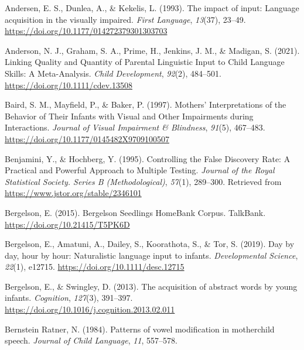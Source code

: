 \documentclass[
  man]{apa6}
\newlength{\cslhangindent}
\newlength{\cslentryspacingunit} %
\newenvironment{CSLReferences}[2] %
 {%
  \setlength{\parindent}{0pt}
  \ifodd #1
  \let\oldpar\par
  \def\par{\hangindent=\cslhangindent\oldpar}
  \fi
  \setlength{\parskip}{#2\cslentryspacingunit}
 }%
 {}
\begin{document}
\hypertarget{refs}{}
\begin{CSLReferences}{1}{0}
\leavevmode{}%
Andersen, E. S., Dunlea, A., \& Kekelis, L. (1993). The impact of input: Language acquisition in the visually impaired. \emph{First Language}, \emph{13}(37), 23--49. \url{https://doi.org/10.1177/014272379301303703}

\leavevmode{}%
Anderson, N. J., Graham, S. A., Prime, H., Jenkins, J. M., \& Madigan, S. (2021). Linking {Quality} and {Quantity} of {Parental Linguistic Input} to {Child Language Skills}: {A Meta-Analysis}. \emph{Child Development}, \emph{92}(2), 484--501. \url{https://doi.org/10.1111/cdev.13508}

\leavevmode{}%
Baird, S. M., Mayfield, P., \& Baker, P. (1997). Mothers' {Interpretations} of the {Behavior} of {Their Infants} with {Visual} and {Other Impairments} during {Interactions}. \emph{Journal of Visual Impairment \& Blindness}, \emph{91}(5), 467--483. \url{https://doi.org/10.1177/0145482X9709100507}

\leavevmode{}%
Benjamini, Y., \& Hochberg, Y. (1995). Controlling the {False Discovery Rate}: {A Practical} and {Powerful Approach} to {Multiple Testing}. \emph{Journal of the Royal Statistical Society. Series B (Methodological)}, \emph{57}(1), 289--300. Retrieved from \url{https://www.jstor.org/stable/2346101}

\leavevmode{}%
Bergelson, E. (2015). Bergelson {Seedlings HomeBank Corpus}. {TalkBank}. \url{https://doi.org/10.21415/T5PK6D}

\leavevmode{}%
Bergelson, E., Amatuni, A., Dailey, S., Koorathota, S., \& Tor, S. (2019). Day by day, hour by hour: {Naturalistic} language input to infants. \emph{Developmental Science}, \emph{22}(1), e12715. \url{https://doi.org/10.1111/desc.12715}

\leavevmode{}%
Bergelson, E., \& Swingley, D. (2013). The acquisition of abstract words by young infants. \emph{Cognition}, \emph{127}(3), 391--397. \url{https://doi.org/10.1016/j.cognition.2013.02.011}

\leavevmode{}%
Bernstein Ratner, N. (1984). Patterns of vowel modification in mother{\textendash}child speech. \emph{Journal of Child Language}, \emph{11}, 557--578.


\end{CSLReferences}
\end{document}
